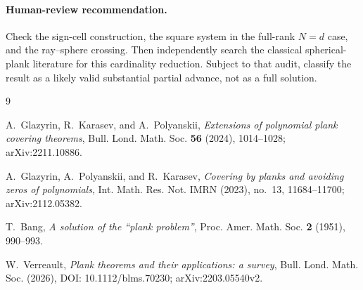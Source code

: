 \documentclass[11pt]{article}
\begin{document}
\paragraph{Human-review recommendation.}
Check the sign-cell construction, the square system in the full-rank $N=d$
case, and the ray--sphere crossing.  Then independently search the classical
spherical-plank literature for this cardinality reduction.  Subject to that
audit, classify the result as a likely valid substantial partial advance, not
as a full solution.

\begin{thebibliography}{9}

A.~Glazyrin, R.~Karasev, and A.~Polyanskii,
\emph{Extensions of polynomial plank covering theorems},
Bull. Lond. Math. Soc. \textbf{56} (2024), 1014--1028;
arXiv:2211.10886.

A.~Glazyrin, A.~Polyanskii, and R.~Karasev,
\emph{Covering by planks and avoiding zeros of polynomials},
Int. Math. Res. Not. IMRN (2023), no.~13, 11684--11700;
arXiv:2112.05382.

T.~Bang,
\emph{A solution of the ``plank problem''},
Proc. Amer. Math. Soc. \textbf{2} (1951), 990--993.

W.~Verreault,
\emph{Plank theorems and their applications: a survey},
Bull. Lond. Math. Soc. (2026), DOI: 10.1112/blms.70230;
arXiv:2203.05540v2.

\end{thebibliography}
\end{document}
